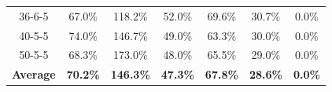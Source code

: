\documentclass[letterpaper]{article} %
\begin{document}
\begin{table}[t]
\begin{tabular}{ccccccc}
36-6-5                   & 67.0\%          & 118.2\%          & 52.0\%          & 69.6\%          & 30.7\%          & 0.0\%          \\
40-5-5                   & 74.0\%          & 146.7\%          & 49.0\%          & 63.3\%          & 30.0\%          & 0.0\%          \\
50-5-5                   & 68.3\%          & 173.0\%          & 48.0\%          & 65.5\%          & 29.0\%          & 0.0\%          \\ \hline
\textbf{Average}         & \textbf{70.2\%} & \textbf{146.3\%} & \textbf{47.3\%} & \textbf{67.8\%} & \textbf{28.6\%} & \textbf{0.0\%} \\ \hline
\end{tabular}
\end{table}

\end{document}
